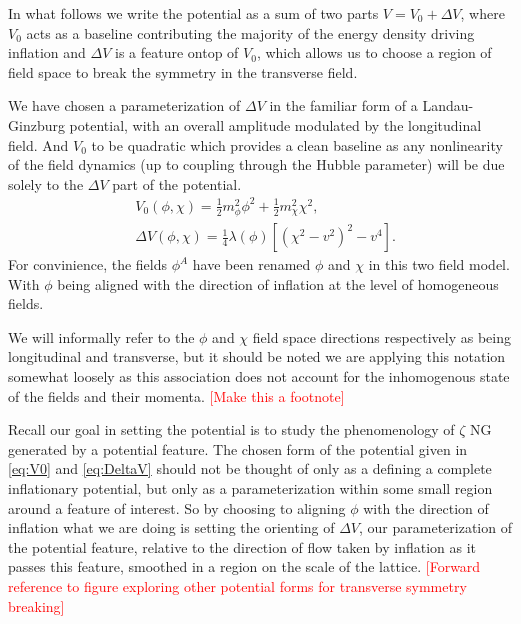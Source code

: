 In what follows we write the potential as a sum of two parts $V = V_0 + \Delta V$, where $V_0$ acts as a baseline contributing the majority of the energy density driving inflation and $\Delta V$ is a feature ontop of $V_0$, which allows us to choose a region of field space to break the symmetry in the transverse field.

We have chosen a parameterization of $\Delta V$ in the familiar form of a Landau-Ginzburg potential, with an overall amplitude modulated by the longitudinal field. And $V_0$ to be quadratic which provides a clean baseline as any nonlinearity of the field dynamics (up to coupling through the Hubble parameter) will be due solely to the $\Delta V$ part of the potential.
\begin{align}
  &V_0(\phi,\chi) = \frac{1}{2}m^2_\phi\phi^2 + \frac{1}{2}m^2_\chi\chi^2, \label{eq:V0} \\
  &\Delta V(\phi,\chi) = \frac{1}{4}\lambda(\phi)\left[ (\chi^2-v^2)^2 - v^4 \right]. \label{eq:DeltaV}
\end{align}
For convinience, the fields $\phi^A$ have been renamed $\phi$ and $\chi$ in this two field model. With $\phi$ being aligned with the direction of inflation at the level of homogeneous fields.


We will informally refer to the $\phi$ and $\chi$ field space directions respectively as being longitudinal and transverse, but it should be noted we are applying this notation somewhat loosely as this association does not account for the inhomogenous state of the fields and their momenta. \textcolor{red}{[Make this a footnote]}

Recall our goal in setting the potential is to study the phenomenology of $\zeta$ NG generated by a potential feature. The chosen form of the potential given in \eqref{eq:V0} and \eqref{eq:DeltaV} should not be thought of only as a defining a complete inflationary potential, but only as a parameterization within some small region around a feature of interest. So by choosing to aligning $\phi$ with the direction of inflation what we are doing is setting the orienting of $\Delta V$, our parameterization of the potential feature, relative to the direction of flow taken by inflation as it passes this feature, smoothed in a region on the scale of the lattice. \textcolor{red}{[Forward reference to figure exploring other potential forms for transverse symmetry breaking]}

